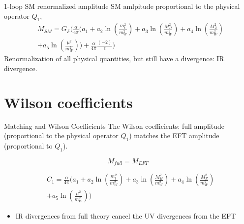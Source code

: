 \documentclass[11pt]{beamer}
\begin{document}
\begin{frame}{1-loop SM renormalized amplitude}
    SM amlpitude proportional to the physical operator $Q_1$,
    \small
\begin{equation}
\begin{split}
  & M_{SM} = 
  G_F ( \frac{\alpha}{4 \pi}( a_1 
+ a_2  \ln\left(\frac{m_t^2}{m_W^2} \right)
+ a_3  \ln\left(\frac{M_H^2}{m_W^2} \right)
+ a_4 \ln\left(\frac{M_Z^2}{m_W^2} \right)\\
&
+ a_5 \ln\left(\frac{\mu^2}{m_W^2}  \right) )+ \frac{\alpha}{4 \pi}\frac{(-2)}{\epsilon})
\end{split}
\end{equation}
Renormalization of all physical quantities, but still have a divergence: IR divergence.
\vspace{.5cm}

\end{frame}












\section{Wilson coefficients}


\begin{frame}{Matching and Wilson Coefficients}
    The Wilson coefficients: full amplitude (proportional to the physical operator $Q_1$) matches the EFT amplitude (proportional to $Q_1$).

\begin{equation}
    M_{full} = M_{EFT}
\end{equation}

\begin{equation}
\begin{split}
  & C_1 = \frac{\alpha}{4 \pi}( a_1 
+ a_2  \ln\left(\frac{m_t^2}{m_W^2} \right)
+ a_3  \ln\left(\frac{M_H^2}{m_W^2} \right)
+ a_4 \ln\left(\frac{M_Z^2}{m_W^2} \right)\\
&
+ a_5 \ln\left(\frac{\mu^2}{m_W^2}  \right) )
\end{split}
\end{equation}

\begin{itemize}
\item IR divergences from full theory cancel the UV divergences from the EFT
\end{itemize}
\end{frame}
\end{document}
